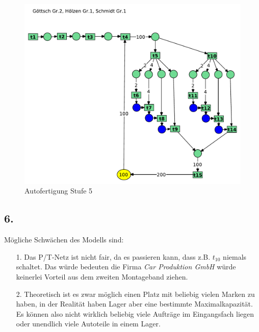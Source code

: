 \documentclass[12pt, paper=a4]{article}
\begin{document}
\begin{figure}[h!]
\centering
\includegraphics[scale=0.63]{7-5-5.pdf}
\caption{Autofertigung Stufe 5}
\end{figure}

\newpage
\subsection*{6.}
Mögliche Schwächen des Modells sind:
\begin{enumerate}
	\item [1.] Das P/T-Netz ist nicht fair, da es passieren kann, dass z.B. $t_{10}$ niemals schaltet. Das würde bedeuten die Firma \textit{Car Produktion GmbH} würde keinerlei Vorteil aus dem zweiten Montageband ziehen.
	\item [2.] Theoretisch ist es zwar möglich einen Platz mit beliebig vielen Marken zu haben, in der Realität haben Lager aber eine bestimmte Maximalkapazität. Es können also nicht wirklich beliebig viele Aufträge im Eingangsfach liegen oder unendlich viele Autoteile in einem Lager.
\end{enumerate}
\end{document}
